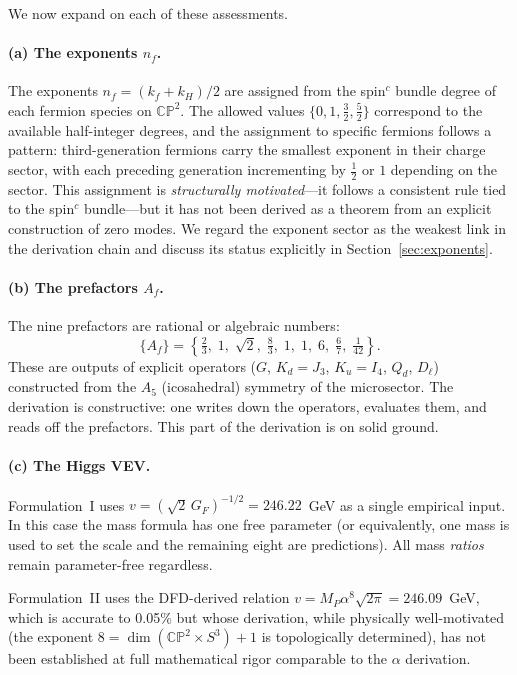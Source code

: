 \documentclass[11pt,a4paper]{article}
\newcommand{\CP}{\mathbb{CP}}
\theoremstyle{definition}
\theoremstyle{remark}
\begin{document}
\noindent
We now expand on each of these assessments.

\paragraph{(a) The exponents $n_f$.}
The exponents $n_f = (k_f + k_H)/2$ are assigned from the spin$^c$
bundle degree of each fermion species on $\CP^2$.
The allowed values $\{0, 1, \tfrac{3}{2}, \tfrac{5}{2}\}$ correspond
to the available half-integer degrees, and the assignment to specific
fermions follows a pattern:
third-generation fermions carry the smallest exponent in their charge
sector, with each preceding generation incrementing by $\tfrac{1}{2}$
or $1$ depending on the sector.
This assignment is \emph{structurally motivated}---it follows a
consistent rule tied to the spin$^c$ bundle---but it has not been
derived as a theorem from an explicit construction of zero modes.
We regard the exponent sector as the weakest link in the derivation
chain and discuss its status explicitly in Section~\ref{sec:exponents}.

\paragraph{(b) The prefactors $A_f$.}
The nine prefactors are rational or algebraic numbers:
\begin{equation}\label{eq:prefactors}
  \{A_f\} = \left\{\tfrac{2}{3},\; 1,\; \sqrt{2},\;
  \tfrac{8}{3},\; 1,\; 1,\;
  6,\; \tfrac{6}{7},\; \tfrac{1}{42}\right\}.
\end{equation}
These are outputs of explicit operators ($G$, $K_d = J_3$,
$K_u = I_4$, $Q_d$, $D_\ell$) constructed from the $A_5$
(icosahedral) symmetry of the microsector.
The derivation is constructive: one writes down the operators,
evaluates them, and reads off the prefactors.
This part of the derivation is on solid ground.

\paragraph{(c) The Higgs VEV.}
Formulation~I uses $v = (\sqrt{2}\,G_F)^{-1/2} = 246.22$~GeV as
a single empirical input.
In this case the mass formula has one free parameter (or equivalently,
one mass is used to set the scale and the remaining eight are
predictions).
All mass \emph{ratios} remain parameter-free regardless.

Formulation~II uses the DFD-derived relation
$v = M_P\alpha^8\sqrt{2\pi} = 246.09$~GeV, which is accurate
to 0.05\% but whose derivation, while physically well-motivated
(the exponent $8 = \dim(\CP^2\times S^3) + 1$ is topologically
determined), has not been established at full mathematical rigor
comparable to the $\alpha$ derivation.
\end{document}
